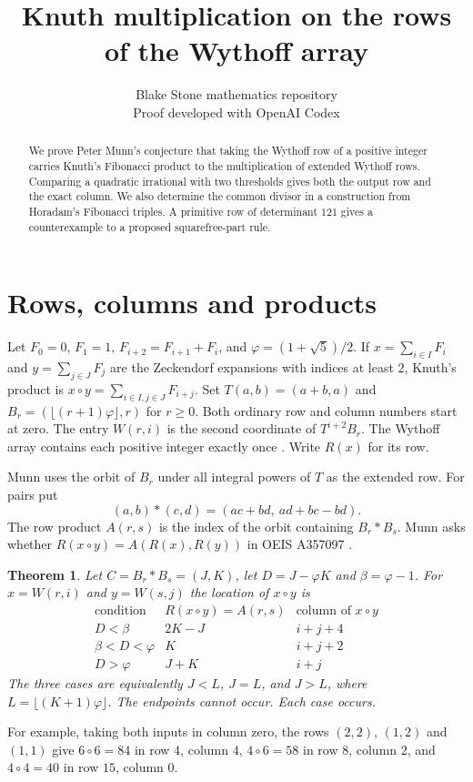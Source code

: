 \documentclass[11pt]{article}
\title{Knuth multiplication on the rows of the Wythoff array}
\author{Blake Stone mathematics repository\\[-2pt]\small Proof developed with OpenAI Codex}
\date{}
\newtheorem{theorem}{Theorem}
\newcommand{\ph}{\varphi}
\newcommand{\fl}[1]{\lfloor #1\rfloor}
\begin{document}
\maketitle
\begin{abstract}
We prove Peter Munn's conjecture that taking the Wythoff row of a positive integer carries
Knuth's Fibonacci product to the multiplication of extended Wythoff rows. Comparing a
quadratic irrational with two thresholds gives both the output row and the exact column.
We also determine the common divisor in a construction from Horadam's Fibonacci triples.
A primitive row of determinant $121$ gives a counterexample to a proposed squarefree-part rule.
\end{abstract}

\section{Rows, columns and products}
Let $F_0=0$, $F_1=1$, $F_{i+2}=F_{i+1}+F_i$, and $\ph=(1+\sqrt5)/2$.
If $x=\sum_{i\in I}F_i$ and $y=\sum_{j\in J}F_j$ are the Zeckendorf expansions
with indices at least $2$, Knuth's product is $x\circ y=\sum_{i\in I,j\in J}F_{i+j}$.
Set $T(a,b)=(a+b,a)$ and $B_r=(\fl{(r+1)\ph},r)$ for $r\ge0$. Both ordinary row and
column numbers start at zero. The entry $W(r,i)$ is the second coordinate of
$T^{i+2}B_r$. The Wythoff array contains each positive integer exactly once
\cite{kim}. Write $R(x)$ for its row.

Munn uses the orbit of $B_r$ under all integral powers of $T$ as the extended row.
For pairs put
\[
 (a,b)*(c,d)=(ac+bd,\ ad+bc-bd).
\]
The row product $A(r,s)$ is the index of the orbit containing $B_r*B_s$.
Munn asks whether $R(x\circ y)=A(R(x),R(y))$ in OEIS A357097 \cite{munn}.

\begin{theorem}\label{main}
Let $C=B_r*B_s=(J,K)$, let $D=J-\ph K$ and $\beta=\ph-1$.
For $x=W(r,i)$ and $y=W(s,j)$ the location of $x\circ y$ is
\[
\begin{array}{c|c|c}
\text{condition}& R(x\circ y)=A(r,s) & \text{column of }x\circ y\\\hline
D<\beta & 2K-J & i+j+4\\
\beta<D<\ph & K & i+j+2\\
D>\ph & J+K & i+j
\end{array}
\]
The three cases are equivalently $J<L$, $J=L$, and $J>L$, where
$L=\fl{(K+1)\ph}$. The endpoints cannot occur. Each case occurs.
\end{theorem}
\noindent
For example, taking both inputs in column zero, the rows $(2,2)$, $(1,2)$
and $(1,1)$ give $6\circ6=84$ in row $4$, column $4$,
$4\circ6=58$ in row $8$, column $2$, and $4\circ4=40$ in row $15$, column $0$.
\end{document}

